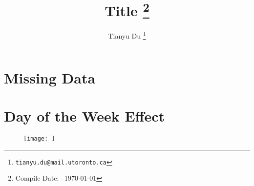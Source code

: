 \documentclass[12pt]{article}
\title{Title \footnote{Compile Date: \currenttime\ \today}}
\author{Tianyu Du \footnote{\texttt{tianyu.du@mail.utoronto.ca}}}
\begin{document}
	\maketitle
	\tableofcontents
	\newpage

	\section{Missing Data}
	\par
 
	\section{Day of the Week Effect}
	\begin{figure}
		\center
		\texttt{[image: ]}
	\end{figure}
\end{document}
